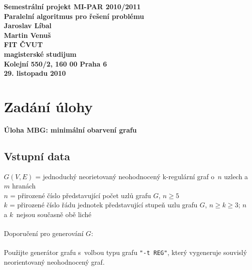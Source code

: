 \documentclass[12pt]{article}
\author{Martin Venuš, Jaroslav Líbal}
\begin{document}

\begin{center}
\bf Semestrální projekt MI-PAR 2010/2011\\[5mm]
    Paralelní algoritmus pro řešení problému\\[5mm]
       Jaroslav Líbal\\
       Martin Venuš\\[5mm]
FIT ČVUT\\[2mm]
magisterské studijum\\[2mm]
Kolejní 550/2, 160 00 Praha 6\\[2mm]
29. listopadu 2010
\end{center}

\newpage
\tableofcontents
\newpage

\section{Zadání úlohy}
\textbf{Úloha MBG: minimální obarvení grafu}

\subsection{Vstupní data}

$G(V,E)$ = jednoduchý neorietovaný neohodnocený k-regulární graf o~$n$ uzlech a $m$ hranách\\
$n$ = přirozené číslo představující počet uzlů grafu $G$, $n \geq 5$\\
$k$ = přirozené číslo řádu jednotek představující stupeň uzlu grafu $G$, $n \geq k \geq 3$; $n$ a $k$~nejsou současně obě liché\\
\\
Doporučení pro generování $G$:\\
\\
Použijte generátor grafu s~volbou typu grafu \texttt{"-t REG"}, který vygeneruje souvislý neorientovaný neohodnocený graf.
\end{document}
